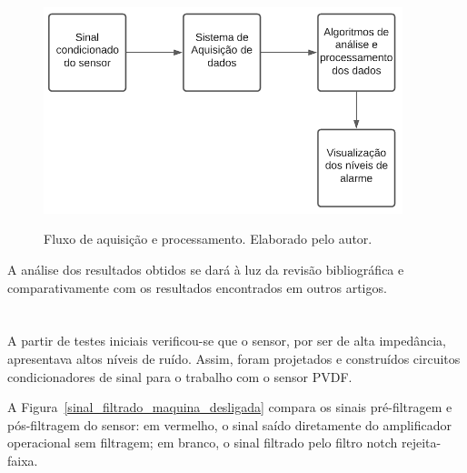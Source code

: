 \documentclass[
	12pt,				
	oneside,			
	a4paper,			
	english,			
	brazil,			
	]{abntex2ppgsi}
\begin{document}
\begin{figure}[H]
\centering
\caption {Fluxo de aquisição e processamento. Elaborado pelo autor.}
\includegraphics[width=\textwidth,height=60mm,keepaspectratio]{fluxograma_funcionamento_sistema}
\label{fluxograma_aquisicao}
\end{figure} 



A análise dos resultados obtidos se dará à luz da revisão bibliográfica e comparativamente com os resultados encontrados em outros artigos. 

\section{}
\label{secao:CircuitosCondicionadores}

A partir de testes iniciais verificou-se que o sensor, por ser de alta impedância, apresentava altos níveis de ruído. Assim, foram projetados e construídos circuitos condicionadores de sinal para o trabalho com o sensor PVDF.  

A Figura~\ref{sinal_filtrado_maquina_desligada} compara os sinais pré-filtragem e pós-filtragem do sensor: em vermelho, o sinal saído diretamente do amplificador operacional sem filtragem; em branco, o sinal filtrado pelo filtro notch rejeita-faixa. 
\end{document}
